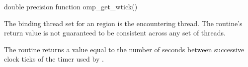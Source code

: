 \fortranspecificstart
\begin{boxedcode}
double precision function omp\_get\_wtick()
\end{boxedcode}
\fortranspecificend

\binding
The binding thread set for an  region is the encountering thread. The 
routine’s return value is not guaranteed to be consistent across any set of threads.

\effect
The  routine returns a value equal to the number of seconds between 
successive clock ticks of the timer used by .




